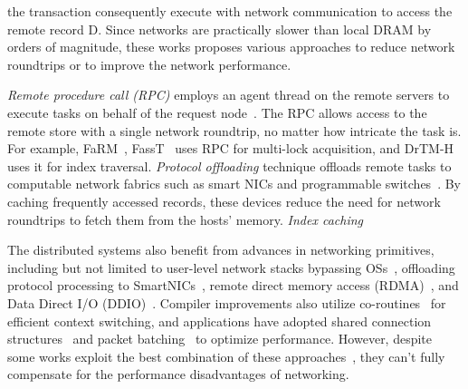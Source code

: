 the transaction consequently execute with network communication to access the remote record D. Since networks are practically slower than local DRAM by orders of magnitude, these works proposes various approaches to reduce network roundtrips or to improve the network performance. 

\textit{Remote procedure call (RPC)} employs an agent thread on the remote servers to execute tasks on behalf of the request node~\cite{fasst, grappa_atc15, calvin, traditional_txn}. The RPC allows access to the remote store with a single network roundtrip, no matter how intricate the task is. For example, FaRM~\cite{farm, comprimise}, FassT~\cite{fasst} uses RPC for multi-lock acquisition, and DrTM-H~\cite{drtm-h} uses it for index traversal. 
\textit{Protocol offloading} technique offloads remote tasks to computable network fabrics such as smart NICs and programmable switches~\cite{xenic_sosp21, concordia_fast21, netcahe_sosp17, spin_sc06, coredirect_ipdps11, percs_hoti10}. By caching frequently accessed records, these devices reduce the need for network roundtrips to fetch them from the hosts' memory.
\textit{Index caching} 


The distributed systems also benefit from advances in networking primitives, including but not limited to user-level network stacks bypassing OSs~\cite{mtcp_nsdi14}, offloading protocol processing to SmartNICs~\cite{xenic_sosp21, ipipe_sigcomm19, linefs_sosp21}, remote direct memory access (RDMA)~\cite{farm, myth_vldb17}, and Data Direct I/O (DDIO)~\cite{ddio_ispass20, ddio-doc}. Compiler improvements also utilize co-routines~\cite{fasst, drtmh, grappa_atc15} for efficient context switching, and applications have adopted shared connection structures~\cite{fasst} and packet batching~\cite{grappa_atc15, guideline_atc16} to optimize performance. However, despite some works exploit the best combination of these approaches~\cite{farm, fasst, grappa_atc15, compromise, drtmh, drtm, storm_systor19, prism_sosp21, guideline_atc16, smartnic_osdi23, xenic_sosp21}, they can't fully compensate for the performance disadvantages of networking. 

